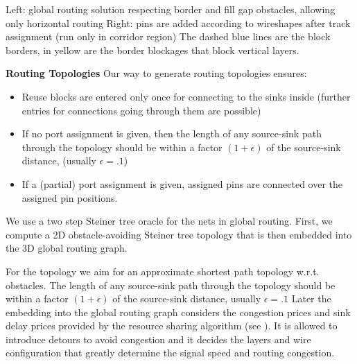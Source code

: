 \documentclass[a2paper]{bigsposter}
\begin{document}
\begin{blockrow}[3]
 {\footnotesize \begin{spacing}{0.9}
 		Left: global routing solution respecting border and fill gap obstacles, allowing only horizontal routing
 		Right: pins are added according to wireshapes after track assignment (run only in corridor region)
 		The dashed blue lines are the block borders, in yellow are the border blockages that block vertical layers.
 	\end{spacing}	}
 
 	
	\blockbreak
	\textbf{Routing Topologies}
	Our way to generate routing topologies ensures:
	\begin{itemize}
		\item Reuse blocks are entered only once for connecting to the sinks inside (further entries for connections going through them are possible)
		\item If no port assignment is given, then the length of any source-sink path through the topology
		should be within a factor $(1+\epsilon)$ of the source-sink distance, (usually $\epsilon=.1$)
		\item If a (partial) port assignment is given, assigned pins are connected over the assigned pin positions.
	\end{itemize}
	We use a two step Steiner tree oracle for the nets in  global routing.
	First, we compute a 2D obstacle-avoiding Steiner tree topology  that is then embedded into the 3D global routing graph.
	
	
	For the topology  we aim  for an approximate shortest path topology w.r.t. obstacles. The length of any source-sink path through the topology
	should be within a factor $(1+\epsilon)$ of the source-sink distance, usually $\epsilon=.1$ 
	Later the embedding into the global routing graph considers the congestion prices and sink delay prices provided by the resource sharing algorithm (see \cite{BRGTiming2}).
	It is allowed to  introduce detours to avoid congestion and it decides the  layers and wire configuration that greatly determine the signal speed and routing congestion.
	

\end{blockrow}
\end{document}
